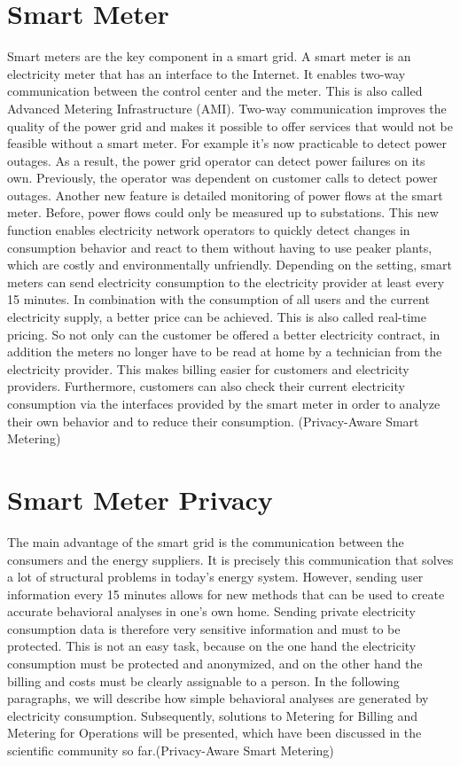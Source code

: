 \section{Smart Meter}
Smart meters are the key component in a smart grid. A smart meter is an electricity meter that has an interface to the Internet. It enables two-way communication between the control center and the meter. This is also called Advanced Metering Infrastructure (AMI). Two-way communication improves the quality of the power grid and makes it possible to offer services that would not be feasible without a smart meter. For example it's now practicable to detect power outages.%
As a result, the power grid operator can detect power failures on its own. Previously, the operator was dependent on customer calls to detect power outages. Another new feature is detailed monitoring of power flows at the smart meter. Before, power flows could only be measured up to substations. This new function enables electricity network operators to quickly detect changes in consumption behavior and react to them without having to use peaker plants, which are costly and environmentally unfriendly. Depending on the setting, smart meters can send electricity consumption to the electricity provider at least every 15 minutes. In combination with the consumption of all users and the current electricity supply, a better price can be achieved. This is also called real-time pricing. So not only can the customer be offered a better electricity contract, in addition the meters no longer have to be read at home by a technician from the electricity provider. This makes billing easier for customers and electricity providers. Furthermore, customers can also check their current electricity consumption via the interfaces provided by the smart meter in order to analyze their own behavior and to reduce their consumption. (Privacy-Aware Smart Metering)
\section{Smart Meter Privacy}
The main advantage of the smart grid is the communication between the consumers and the energy suppliers. It is precisely this communication that solves a lot of structural problems in today's energy system. However, sending user information every 15 minutes allows for new methods that can be used to create accurate behavioral analyses in one's own home. Sending private electricity consumption data is therefore very sensitive information and must to be protected. This is not an easy task, because on the one hand the electricity consumption must be protected and anonymized, and on the other hand the billing and costs must be clearly assignable to a person. In the following paragraphs, we will describe how simple behavioral analyses are generated by electricity consumption. Subsequently, solutions to Metering for Billing and Metering for Operations will be presented, which have been discussed in the scientific community so far.(Privacy-Aware Smart Metering) 
